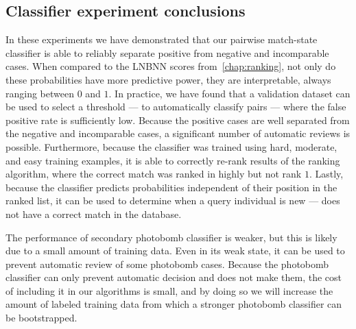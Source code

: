         \ConfusionPhotobomb{}

        \EvalMetricsPhotobomb{}


    \FloatBarrier{}
    \subsection{Classifier experiment conclusions}
        In these experiments we have demonstrated that our pairwise match-state classifier is able to reliably
          separate positive from negative and incomparable cases.
        When compared to the LNBNN scores from~\cref{chap:ranking}, not only do these probabilities have more
          predictive power, they are interpretable, always ranging between $0$ and $1$.
        In practice, we have found that a validation dataset can be used to select a threshold --- to
          automatically classify pairs --- where the false positive rate is sufficiently low.
        Because the positive cases are well separated from the negative and incomparable cases, a significant
          number of automatic reviews is possible.
        Furthermore, because the classifier was trained using hard, moderate, and easy training examples, it is
          able to correctly re-rank results of the ranking algorithm, where the correct match was ranked in highly
          but not rank $1$.
        Lastly, because the classifier predicts probabilities independent of their position in the ranked list,
          it can be used to determine when a query individual is new --- \ie{} does not have a correct match in the
          database.

        The performance of secondary photobomb classifier is weaker, but this is likely due to a small amount of
          training data.
        Even in its weak state, it can be used to prevent automatic review of some photobomb cases.
        Because the photobomb classifier can only prevent automatic decision and does not make them, the cost of
          including it in our algorithms is small, and by doing so we will increase the amount of labeled training
          data from which a stronger photobomb classifier can be bootstrapped.


